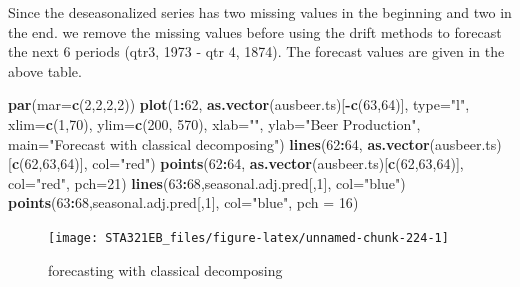 \documentclass[
]{book}
\newenvironment{Shaded}{\begin{snugshade}}{\end{snugshade}}
\newcommand{\AttributeTok}[1]{\textcolor[rgb]{0.13,0.29,0.53}{#1}}
\newcommand{\DecValTok}[1]{\textcolor[rgb]{0.00,0.00,0.81}{#1}}
\newcommand{\FunctionTok}[1]{\textcolor[rgb]{0.13,0.29,0.53}{\textbf{#1}}}
\newcommand{\NormalTok}[1]{#1}
\newcommand{\SpecialCharTok}[1]{\textcolor[rgb]{0.81,0.36,0.00}{\textbf{#1}}}
\newcommand{\StringTok}[1]{\textcolor[rgb]{0.31,0.60,0.02}{#1}}
\begin{document}
Since the deseasonalized series has two missing values in the beginning and two in the end. we remove the missing values before using the drift methods to forecast the next 6 periods (qtr3, 1973 - qtr 4, 1874). The forecast values are given in the above table.

\begin{Shaded}
\begin{Highlighting}[]
\FunctionTok{par}\NormalTok{(}\AttributeTok{mar=}\FunctionTok{c}\NormalTok{(}\DecValTok{2}\NormalTok{,}\DecValTok{2}\NormalTok{,}\DecValTok{2}\NormalTok{,}\DecValTok{2}\NormalTok{))}
\FunctionTok{plot}\NormalTok{(}\DecValTok{1}\SpecialCharTok{:}\DecValTok{62}\NormalTok{, }\FunctionTok{as.vector}\NormalTok{(ausbeer.ts)[}\SpecialCharTok{{-}}\FunctionTok{c}\NormalTok{(}\DecValTok{63}\NormalTok{,}\DecValTok{64}\NormalTok{)], }\AttributeTok{type=}\StringTok{"l"}\NormalTok{, }\AttributeTok{xlim=}\FunctionTok{c}\NormalTok{(}\DecValTok{1}\NormalTok{,}\DecValTok{70}\NormalTok{), }\AttributeTok{ylim=}\FunctionTok{c}\NormalTok{(}\DecValTok{200}\NormalTok{, }\DecValTok{570}\NormalTok{),}
     \AttributeTok{xlab=}\StringTok{""}\NormalTok{, }\AttributeTok{ylab=}\StringTok{"Beer Production"}\NormalTok{, }\AttributeTok{main=}\StringTok{"Forecast with classical decomposing"}\NormalTok{)}
\FunctionTok{lines}\NormalTok{(}\DecValTok{62}\SpecialCharTok{:}\DecValTok{64}\NormalTok{,  }\FunctionTok{as.vector}\NormalTok{(ausbeer.ts)[}\FunctionTok{c}\NormalTok{(}\DecValTok{62}\NormalTok{,}\DecValTok{63}\NormalTok{,}\DecValTok{64}\NormalTok{)], }\AttributeTok{col=}\StringTok{"red"}\NormalTok{)}
\FunctionTok{points}\NormalTok{(}\DecValTok{62}\SpecialCharTok{:}\DecValTok{64}\NormalTok{,  }\FunctionTok{as.vector}\NormalTok{(ausbeer.ts)[}\FunctionTok{c}\NormalTok{(}\DecValTok{62}\NormalTok{,}\DecValTok{63}\NormalTok{,}\DecValTok{64}\NormalTok{)], }\AttributeTok{col=}\StringTok{"red"}\NormalTok{, }\AttributeTok{pch=}\DecValTok{21}\NormalTok{)}
\FunctionTok{lines}\NormalTok{(}\DecValTok{63}\SpecialCharTok{:}\DecValTok{68}\NormalTok{,seasonal.adj.pred[,}\DecValTok{1}\NormalTok{], }\AttributeTok{col=}\StringTok{"blue"}\NormalTok{)}
\FunctionTok{points}\NormalTok{(}\DecValTok{63}\SpecialCharTok{:}\DecValTok{68}\NormalTok{,seasonal.adj.pred[,}\DecValTok{1}\NormalTok{], }\AttributeTok{col=}\StringTok{"blue"}\NormalTok{, }\AttributeTok{pch =} \DecValTok{16}\NormalTok{)}
\end{Highlighting}
\end{Shaded}

\begin{figure}

{\centering \texttt{[image: STA321EB\_files/figure-latex/unnamed-chunk-224-1]} 

}

\caption{forecasting with classical decomposing}\label{fig:unnamed-chunk-224}
\end{figure}
\end{document}
